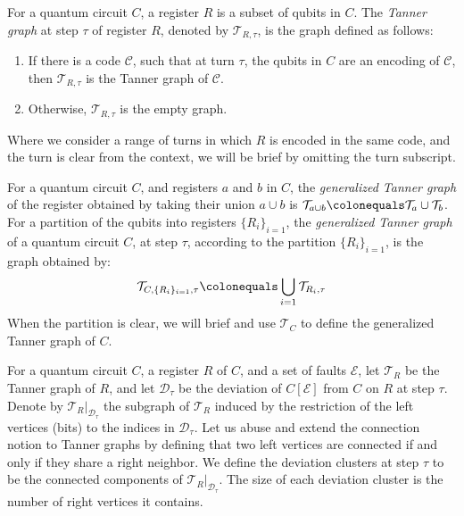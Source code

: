 \begin{definition}
  For a quantum circuit $C$, a register $R$ is a subset of qubits in $C$. The \textit{Tanner graph} at step $\tau$ of register $R$, denoted by $\mathcal{T}_{R, \tau}$, is the graph defined as follows:
  \begin{enumerate}
    \item If there is a code $\mathcal{C}$, such that at turn $\tau$, the qubits in $C$ are an encoding of $\mathcal{C}$, then $\mathcal{T}_{R, \tau}$ is the Tanner graph of $\mathcal{C}$.
    \item Otherwise, $\mathcal{T}_{R, \tau}$ is the empty graph.
  \end{enumerate}
Where we consider a range of turns in which $R$ is encoded in the same code, and the turn is clear from the context, we will be brief by omitting the turn subscript.
\end{definition}
\begin{definition}
For a quantum circuit $C$, and registers $a$ and $b$ in $C$, the \textit{generalized Tanner graph} of the register obtained by taking their union $a \cup b$ is $\mathcal{T}_{a \cup b} \colonequals \mathcal{T}_{a} \cup \mathcal{T}_{b}$. For a partition of the qubits into registers $\{R_{i}\}_{i=1}$, the \textit{generalized Tanner graph} of a quantum circuit $C$, at step $\tau$, according to the partition $\{R_{i}\}_{i=1}$, is the graph obtained by:
  \begin{equation*}
    \begin{split}
      \mathcal{T}_{C, \{R_{i}\}_{i=1}, \tau } \colonequals \bigcup_{i=1} \mathcal{T}_{R_{i}, \tau}
    \end{split}
  \end{equation*}
When the partition is clear, we will brief and use $\mathcal{T}_{C}$ to define the generalized Tanner graph of $C$.
\end{definition}

\begin{definition}
For a quantum circuit $C$, a register $R$ of $C$, and a set of faults $\mathcal{E}$, let $\mathcal{T}_{R}$ be the Tanner graph of $R$, and let $\mathcal{D}_{\tau}$ be the deviation of $C[\mathcal{E}]$ from $C$ on $R$ at step $\tau$. Denote by $\mathcal{T}_{R}|_{\mathcal{D}_{\tau}}$ the subgraph of $\mathcal{T}_{R}$ induced by the restriction of the left vertices (bits) to the indices in $\mathcal{D}_{\tau}$. Let us abuse and extend the connection notion to Tanner graphs by defining that two left vertices are connected if and only if they share a right neighbor. We define the deviation clusters at step $\tau$ to be the connected components of $\mathcal{T}_{R}|_{\mathcal{D}_{\tau}}$. The size of each deviation cluster is the number of right vertices it contains.
\end{definition}

